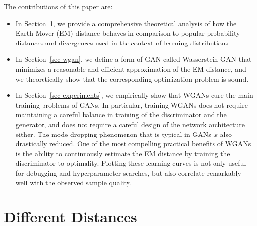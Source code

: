 \documentclass{article} %
\theoremstyle{definition}
\theoremstyle{definition}
\begin{document}
\pagebreak
The contributions of this paper are:
\begin{itemize}
\item In Section~\ref{sec-distances}, we provide a comprehensive
  theoretical analysis of how the Earth Mover (EM) distance behaves in comparison to
  popular probability distances and divergences used in the
  context of learning distributions.
\item In Section~\ref{sec-wgan}, we define a form of GAN called Wasserstein-GAN
  that minimizes a reasonable and efficient approximation of the EM distance,
  and we theoretically show that the corresponding optimization 
  problem is sound.
\item In Section~\ref{sec-experiments}, we empirically show that WGANs
  cure the main training problems of GANs. In particular, training
  WGANs does not require maintaining a careful balance in training of
  the discriminator and the generator, and does not require a careful
  design of the network architecture either. The mode dropping
  phenomenon that is typical in GANs is also drastically reduced.  One
  of the most compelling practical benefits of WGANs is the ability to
  continuously estimate the EM distance by training the
  discriminator to optimality. Plotting these learning curves is not
  only useful for debugging and hyperparameter searches, but also
  correlate remarkably well with the observed sample quality.
\end{itemize}


\section{Different Distances}
\label{sec-distances}
\end{document}
